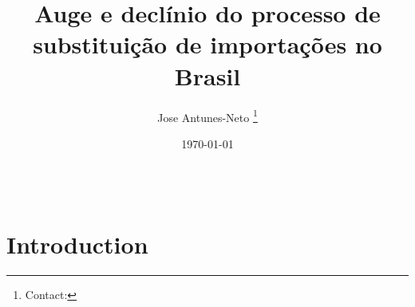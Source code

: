 \documentclass[a4paper, 12pt, bibend = biber, citestyle = apa, bibstyle = apa]{elegantpaper}
\title{Auge e declínio do processo de substituição de importações no Brasil}
\author{
  Jose Antunes-Neto \thanks{Contact: \email{jose.neto@kellogg.northwestern.edu}}
  }
\institute{Kellogg School of Management}
\date{\today}
\begin{document}
\maketitle

\begin{abstract}
  \lipsum[1] \\
  \cite{tavares2001study} \cite{tavares2016growth}
\end{abstract}

\newpage

\section{Introduction}

\lipsum[2-5]

\newpage

\nocite{*}
\printbibliography
\end{document}
